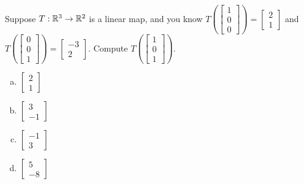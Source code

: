 \begin{applicationActivities}
\begin{activity}{3}
Suppose \(T: \mathbb{R}^3 \rightarrow \mathbb{R}^2\) is a linear map, and you know
\(
  T\left(\begin{bmatrix} 1 \\ 0 \\ 0 \end{bmatrix} \right)
=
  \begin{bmatrix} 2 \\ 1 \end{bmatrix}
\)
and
\(
  T\left(\begin{bmatrix} 0 \\ 0 \\ 1 \end{bmatrix} \right)
=
  \begin{bmatrix} -3 \\ 2 \end{bmatrix}
\).
Compute \(T\left(\begin{bmatrix} 1 \\ 0 \\ 1 \end{bmatrix}\right)\).
\begin{multicols}{2}
\begin{enumerate}[(a)]
\item \(\begin{bmatrix} 2 \\ 1\end{bmatrix}\)
\item \(\begin{bmatrix} 3 \\ -1 \end{bmatrix}\)
\item \(\begin{bmatrix} -1 \\ 3 \end{bmatrix}\)
\item \(\begin{bmatrix} 5 \\ -8 \end{bmatrix}\)
\end{enumerate}
\end{multicols}
\end{activity}


\end{applicationActivities}

